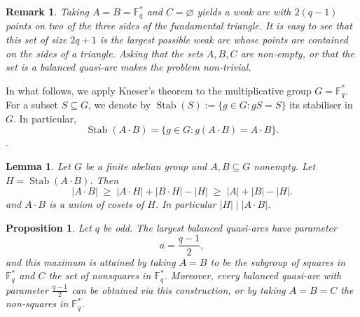 \documentclass{article}
\newtheorem{lemma}{Lemma}
\newtheorem{proposition}{Proposition}
\newtheorem{remark}{Remark}
\newcommand{\F}{\mathbb{F}}
\newcommand{\Stab}{\operatorname{Stab}}
\begin{document}
\begin{remark}
Taking
$A=B=\F_q^\ast$ and $C=\varnothing$ yields a weak arc with $2(q-1)$ points on two of the three sides of the fundamental triangle. It is easy to see that this set of size $2q+1$ is the largest possible weak arc whose points are contained on the sides of a triangle. Asking that the sets $A,B,C$ are non-empty, or that the set is a balanced quasi-arc makes the problem non-trivial.
\end{remark}




In what follows, we apply Kneser's theorem to the multiplicative group
$G=\F_q^\ast$.
For a subset $S\subseteq G$, we denote by $\Stab(S):=\{g\in G:gS=S\}$ its stabiliser in $G$. In particular,
\[
\Stab(A\cdot B)=\{g\in G:g(A\cdot B)=A\cdot B\}.
\].


\begin{lemma} \cite{Kneser}\label{lem:kneser}
Let $G$ be a finite abelian group and $A,B\subseteq G$ nonempty. Let
$H=\Stab(A\cdot B)$. Then 
\[
  |A\cdot B|\;\ge\;|A\!\cdot\! H|+|B\!\cdot\! H|-|H|\;\ge\;|A|+|B|-|H|.
\]
and $A\cdot B$ is a union of cosets of $H$. In particular $|H|\mid|A\cdot B|$.
\end{lemma}







\begin{proposition}\label{cor:odd}
Let $q$ be odd. The largest balanced quasi-arcs have parameter
\[
  a=\frac{q-1}{2},
\]
and this maximum is attained by taking $A=B$ to be the subgroup of squares in $\F_q^*$ and $C$ the set of
nonsquares in $\F_q^*$. Moreover, every balanced quasi-arc with parameter $\frac{q-1}{2}$ can be obtained via this construction, or by taking $A=B=C$ the non-squares in $\F_q^*$.
\end{proposition}
\end{document}
